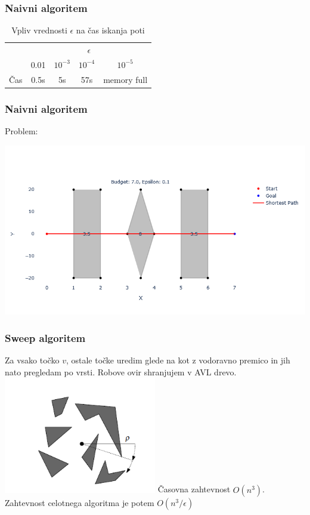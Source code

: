 \documentclass{beamer}
\begin{document}
\begin{frame}
    \frametitle{Naivni algoritem}
   
    \begin{table}[h]
        \centering
        \begin{tabular}{|c|c|c|c|c|}
            \hline
            & \multicolumn{4}{c|}{$\epsilon$} \\
            \cline{2-5}
            & 0.01 & $10^{-3}$ & $10^{-4}$ & $10^{-5}$ \\
            \hline
            Čas & 0.5s & 5s &  57s & memory full \\
            \hline
           
        \end{tabular}
        \caption{Vpliv vrednosti $\epsilon$ na čas iskanja poti}
        \label{tab:2}
    \end{table}


\end{frame}

\begin{frame}
    \frametitle{Naivni algoritem}
    Problem:

    \includegraphics[width=1\textwidth]{naiveErr.png}
\end{frame}

\begin{frame}
    \frametitle{Sweep algoritem}
    
    Za vsako točko $v$, ostale točke uredim glede na kot z vodoravno premico in jih nato pregledam po vrsti. Robove ovir shranjujem v AVL drevo.
    \pause
    \includegraphics[width=0.5\textwidth]{sweep.png}
    \pause
    Časovna zahtevnost $O(n^3)$. Zahtevnost celotnega algoritma je potem  $O(n^3/\epsilon)$

    
\end{frame}
\end{document}
